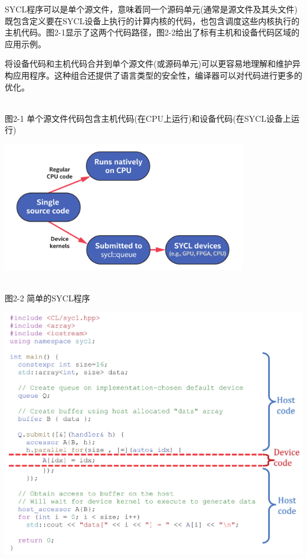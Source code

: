 
SYCL程序可以是单个源文件，意味着同一个源码单元(通常是源文件及其头文件)既包含定义要在SYCL设备上执行的计算内核的代码，也包含调度这些内核执行的主机代码。图2-1显示了这两个代码路径，图2-2给出了标有主机和设备代码区域的应用示例。\par

将设备代码和主机代码合并到单个源文件(或源码单元)可以更容易地理解和维护异构应用程序。这种组合还提供了语言类型的安全性，编译器可以对代码进行更多的优化。\par

\hspace*{\fill} \\ %
图2-1 单个源文件代码包含主机代码(在CPU上运行)和设备代码(在SYCL设备上运行)
\begin{center}
	\includegraphics[width=0.8\textwidth]{content/chapter-2/images/2}
\end{center}

\hspace*{\fill} \\ %
图2-2 简单的SYCL程序
\begin{center}
	\includegraphics[width=1.\textwidth]{content/chapter-2/images/3}
\end{center}

